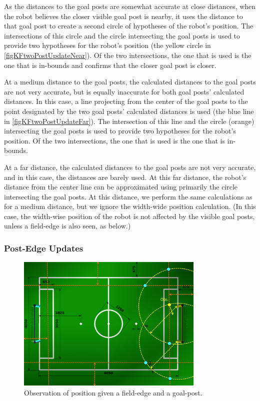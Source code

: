 \documentclass[pdftex,11pt,a4paper]{report}
\begin{document}
As the distances to the goal posts are somewhat accurate at close distances,
when the robot believes the closer visible goal post is nearby, it uses the
distance to that goal post to create a second circle of hypotheses of the
robot's position. The intersections of this circle and the circle intersecting
the goal posts is used to provide two hypotheses for the robot's position
(the yellow circle in \autoref{figKFtwoPostUpdateNear}). Of the two
intersections, the one that is used is the one that is in-bounds and confirms
that the closer goal post is closer.

At a medium distance to the goal posts, the calculated distances to the goal
posts are not very accurate, but is equally inaccurate for both goal posts'
calculated distances.  In this case, a line projecting from the center of the
goal posts to the point designated by the two goal posts' calculated distances
is used (the blue line in \autoref{figKFtwoPostUpdateFar}).  The intersection of
this line and the circle (orange) intersecting the goal posts is used to
provide two hypotheses for the robot's position.  Of the two intersections, the
one that is used is the one that is in-bounds.

At a far distance, the calculated distances to the goal posts are not very
accurate, and in this case, the distances are barely used.  At this far
distance, the robot's distance from the center line can be approximated using
primarily the circle intersecting the goal posts.  At this distance, we
perform the same calculations as for a medium distance, but we ignore the
width-wide position calculation. (In this case, the width-wise position of the
robot is not affected by the visible goal posts, unless a field-edge is also
seen, as below.)

\subsubsection{Post-Edge Updates} \label{subsubsecPostEdgeUpdate}

\begin{figure} [ht]
\centering
\includegraphics[width=0.8\textwidth]{figures/KFpostEdgeUpdate}
\caption{Observation of position given a field-edge and a goal-post.} \label{figKFpostEdgeUpdate}
\end{figure}
\end{document}
